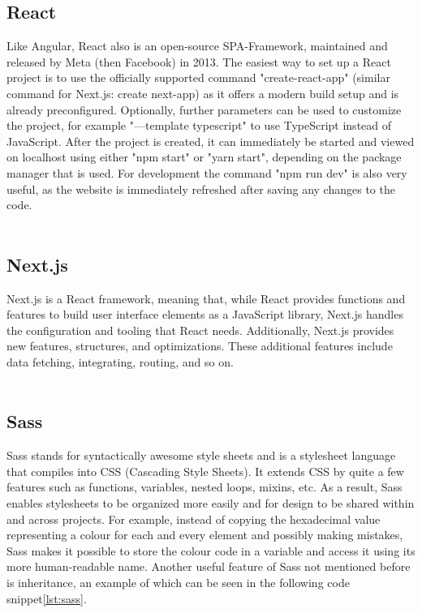 \subsection{React}
Like Angular, React also is an open-source SPA-Framework, maintained and released by Meta (then Facebook) in 2013.
The easiest way to set up a React project is to use the officially supported command "create-react-app" 
(similar command for Next.js: create next-app) as it offers a modern build setup and is already preconfigured. 
Optionally, further parameters can be used to customize the project, for example "—template typescript" to use TypeScript 
instead of JavaScript. After the project is created, it can immediately be started and viewed on localhost using either 
"npm start" or "yarn start", depending on the package manager that is used. For development the command "npm run dev" is 
also very useful, as the website is immediately refreshed after saving any changes to the code. \cite{create-react}
\\
\\
\subsection{Next.js}
Next.js is a React framework, meaning that, while React provides functions and features to build user interface elements
as a JavaScript library, Next.js handles the configuration and tooling that React needs. Additionally, Next.js provides
new features, structures, and optimizations. These additional features include data fetching, integrating, routing,
and so on. \cite{NextjsDescription}
\\
\\
\subsection{Sass}
Sass stands for syntactically awesome style sheets and is a stylesheet language that compiles into CSS (Cascading Style Sheets). 
It extends CSS by quite a few features such as functions, variables, nested loops, mixins, etc. As a result, Sass enables 
stylesheets to be organized more easily and for design to be shared within and across projects. 
For example, instead of copying the hexadecimal value representing a colour for each and every element and possibly making mistakes, 
Sass makes it possible to store the colour code in a variable and access it using its more human-readable name.
Another useful feature of Sass not mentioned before is inheritance, an example of which can be seen in the following code snippet\ref{lst:sass}.

